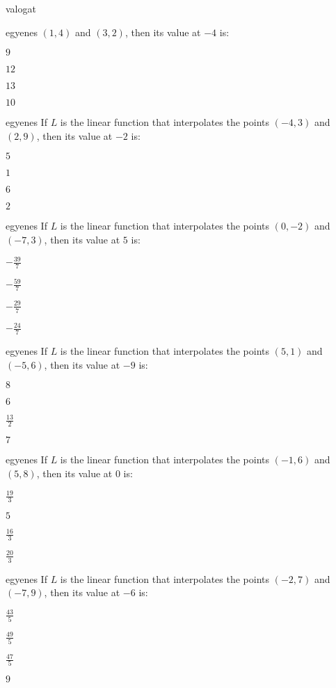 \documentclass[12pt]{article}
\begin{document}
\begin{quiz}{valogat}
\begin{multi}{egyenes}
$(1,4)$ and $(3,2)$, then its value at $-4$ is:
\item* $ 9 $
\item  $ 12 $
\item  $ 13 $
\item  $ 10 $
\end{multi}
\begin{multi}{egyenes}
If $L$ is the linear function that interpolates the points
$(-4,3)$ and $(2,9)$, then its value at $-2$ is:
\item* $ 5 $
\item  $ 1 $
\item  $ 6 $
\item  $ 2 $
\end{multi}
\begin{multi}{egyenes}
If $L$ is the linear function that interpolates the points
$(0,-2)$ and $(-7,3)$, then its value at $5$ is:
\item* $ -\frac{39}{7} $
\item  $ -\frac{59}{7} $
\item  $ -\frac{29}{7} $
\item  $ -\frac{24}{7} $
\end{multi}
\begin{multi}{egyenes}
If $L$ is the linear function that interpolates the points
$(5,1)$ and $(-5,6)$, then its value at $-9$ is:
\item* $ 8 $
\item  $ 6 $
\item  $ \frac{13}{2} $
\item  $ 7 $
\end{multi}
\begin{multi}{egyenes}
If $L$ is the linear function that interpolates the points
$(-1,6)$ and $(5,8)$, then its value at $0$ is:
\item* $ \frac{19}{3} $
\item  $ 5 $
\item  $ \frac{16}{3} $
\item  $ \frac{20}{3} $
\end{multi}
\begin{multi}{egyenes}
If $L$ is the linear function that interpolates the points
$(-2,7)$ and $(-7,9)$, then its value at $-6$ is:
\item* $ \frac{43}{5} $
\item  $ \frac{49}{5} $
\item  $ \frac{47}{5} $
\item  $ 9 $
\end{multi}

\end{quiz}
\end{document}
